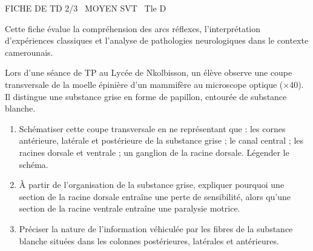 \documentclass[11pt]{article}
\begin{document}
\begin{tcolorbox}[enhanced,colback=popink,colframe=popink,arc=10pt,boxrule=0pt,left=12pt,right=12pt,top=9pt,bottom=9pt]
{\color{white}\popxbold\small FICHE DE TD 2/3 \textbullet\ MOYEN \hfill SVT \textbullet\ Tle D\par}
\end{tcolorbox}
\vspace{4pt}
\noindent Cette fiche évalue la compréhension des arcs réflexes, l'interprétation d'expériences classiques et l'analyse de pathologies neurologiques dans le contexte camerounais.

\begin{exercice}
Lors d'une séance de TP au Lycée de Nkolbisson, un élève observe une coupe transversale de la moelle épinière d'un mammifère au microscope optique (×40). Il distingue une substance grise en forme de papillon, entourée de substance blanche.
\begin{enumerate}
    \item Schématiser cette coupe transversale en ne représentant que : les cornes antérieure, latérale et postérieure de la substance grise ; le canal central ; les racines dorsale et ventrale ; un ganglion de la racine dorsale. Légender le schéma.
    \item À partir de l'organisation de la substance grise, expliquer pourquoi une section de la racine dorsale entraîne une perte de sensibilité, alors qu'une section de la racine ventrale entraîne une paralysie motrice.
    \item Préciser la nature de l'information véhiculée par les fibres de la substance blanche situées dans les colonnes postérieures, latérales et antérieures.
\end{enumerate}
\end{exercice}
\end{document}
